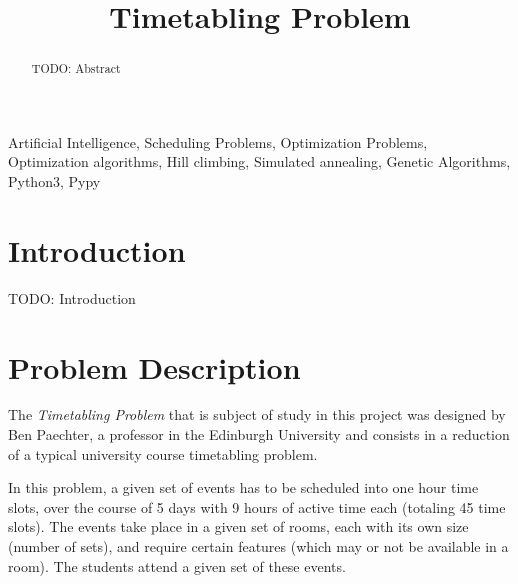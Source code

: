 \documentclass[conference]{IEEEtran}
\begin{document}
\title{Timetabling Problem}

\author{
\and
{}
\and
{}
}

\maketitle

\begin{abstract}
TODO: Abstract
\end{abstract}

\begin{IEEEkeywords}
Artificial Intelligence, Scheduling Problems, Optimization Problems, Optimization algorithms, Hill climbing, Simulated annealing, Genetic Algorithms, Python3, Pypy
\end{IEEEkeywords}

\section{Introduction}

TODO: Introduction

\section{Problem Description}

The \textit{Timetabling Problem} that is subject of study in this project was designed by Ben Paechter, a professor in the Edinburgh University and consists in a reduction of a typical university course timetabling problem.

In this problem, a given set of events has to be scheduled into one hour time slots, over the course of 5 days with 9 hours of active time each (totaling 45 time slots). The events take place in a given set of rooms, each with its own size (number of sets), and require certain features (which may or not be available in a room). The students attend a given set of these events. 
\end{document}
